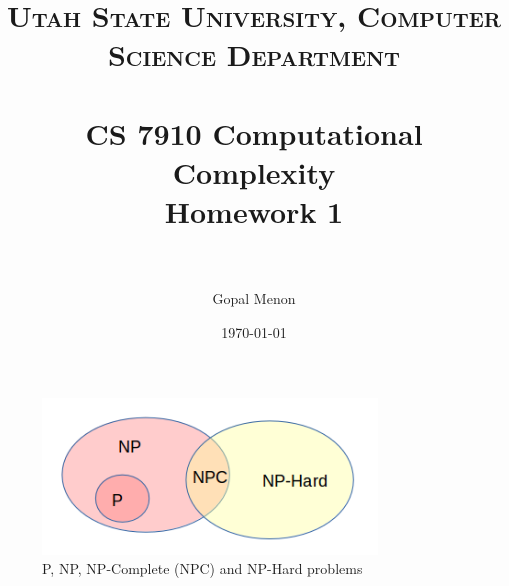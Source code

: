 \documentclass[paper=a4, fontsize=11pt]{scrartcl} %
\title{	
\normalfont \normalsize 
\textsc{Utah State University, Computer Science Department} \\ [25pt] %
\horrule{0.5pt} \\[0.4cm] %
\huge CS 7910 Computational Complexity\\Homework 1 \\ %
\horrule{2pt} \\[0.5cm] %
}
\author{Gopal Menon} %
\date{\normalsize\today} %
\numberwithin{equation}{section} %
\numberwithin{figure}{section} %
\numberwithin{table}{section} %
\begin{document}
\maketitle %

\begin{figure}[!h]
\centering
\includegraphics[width=3.5in]{P-NP.png}
\caption{P, NP, NP-Complete (NPC) and NP-Hard problems}
\label{P-NP}
\end{figure}
\end{document}
